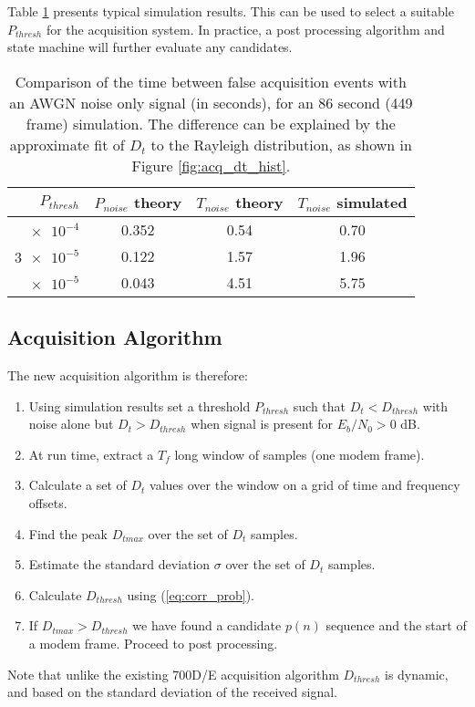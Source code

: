 \documentclass{article}
\begin{document}
Table \ref{tab:noise_false_comparsion} presents typical simulation results.  This can be used to select a suitable $P_{thresh}$ for the acquisition system.  In practice, a post processing algorithm and state machine will further evaluate any candidates.

\begin{table}[h]
\centering
\begin{tabular}{r c c c}
 \hline
 $P_{thresh}$ & $P_{noise}$ theory & $T_{noise}$ theory & $T_{noise}$ simulated \\
 \hline
 $\num{e-4}$ & 0.352 & 0.54 & 0.70 \\
 $\num{3e-5}$ & 0.122 & 1.57 & 1.96 \\
 $\num{e-5}$ & 0.043 & 4.51 & 5.75 \\
 \hline
\end{tabular}
\caption{Comparison of the time between false acquisition events with an AWGN noise only signal (in seconds), for an 86 second (449 frame) simulation. The difference can be explained by the approximate fit of $D_t$ to the Rayleigh distribution, as shown in Figure \ref{fig:acq_dt_hist}.}
\label{tab:noise_false_comparsion}
\end{table}

\subsection{Acquisition Algorithm}

The new acquisition algorithm is therefore:
\begin{enumerate}
\item Using simulation results set a threshold $P_{thresh}$ such that $D_t < D_{thresh}$ with noise alone but $D_t > D_{thresh}$ when signal is present for $E_b/N_0 > 0$ dB.
\item At run time, extract a $T_f$ long window of samples (one modem frame).
\item Calculate a set of $D_t$ values over the window on a grid of time and frequency offsets.
\item Find the peak $D_{tmax}$ over the set of $D_t$ samples.
\item Estimate the standard deviation $\sigma$ over the set of $D_t$ samples.
\item Calculate $D_{thresh}$ using (\ref{eq:corr_prob}).
\item If $D_{tmax} > D_{thresh}$ we have found a candidate $p(n)$ sequence and the start of a modem frame. Proceed to post processing.
\end{enumerate}
Note that unlike the existing 700D/E acquisition algorithm $D_{thresh}$ is dynamic, and based on the standard deviation of the received signal.
\end{document}
